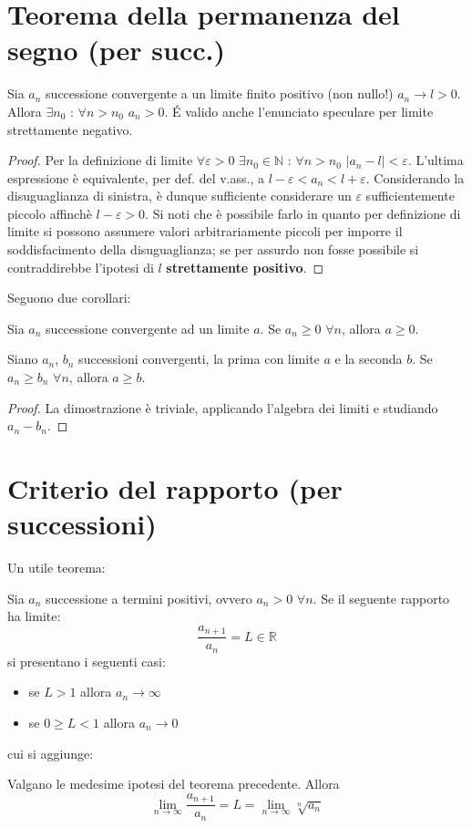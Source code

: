\documentclass[10pt, oneside]{book}
\theoremstyle{plain}
\begin{document}
\section{Teorema della permanenza del segno (per succ.)}
\begin{ther}
    Sia $a_n$ successione convergente a un limite finito positivo (non nullo!) $a_n \rightarrow l > 0$. Allora $\exists n_0$ : $\forall n > n_0$ $a_n > 0$. \'E valido anche l'enunciato speculare per limite strettamente negativo.
\end{ther}
\begin{proof}
    Per la definizione di limite $\forall \varepsilon > 0$ $\exists n_0 \in \mathbb{N}$ : $\forall n > n_0$ $|a_n - l| < \varepsilon$. L'ultima espressione è equivalente, per def. del v.ass., a $l - \varepsilon < a_n < l + \varepsilon$. Considerando la disuguaglianza di sinistra, è dunque sufficiente considerare un $\varepsilon$ sufficientemente piccolo affinchè $l - \varepsilon > 0$. Si noti che è possibile farlo in quanto per definizione di limite si possono assumere valori arbitrariamente piccoli per imporre il soddisfacimento della disuguaglianza; se per assurdo non fosse possibile si contraddirebbe l'ipotesi di $l$ \textbf{strettamente positivo}.
\end{proof}
Seguono due corollari:
\begin{cor}
    Sia $a_n$ successione convergente ad un limite $a$. Se $a_n \geq 0$ $\forall n$, allora $a \geq 0$.
\end{cor}
\begin{cor}
    Siano $a_n$, $b_n$ successioni convergenti, la prima con limite $a$ e la seconda $b$. Se $a_n \geq b_n$ $\forall n$, allora $a \geq b$.
\end{cor}
\begin{proof}
    La dimostrazione è triviale, applicando l'algebra dei limiti e studiando $a_n - b_n$.
\end{proof}

\section{Criterio del rapporto (per successioni)}
Un utile teorema:
\begin{ther}
    Sia $a_n$ successione a termini positivi, ovvero $a_n > 0$ $\forall n$. Se il seguente rapporto ha limite:
    \[\frac{a_{n+1}}{a_n} = L \in \mathbb{R}\]
    si presentano i seguenti casi:
    \begin{itemize}
        \item se $L > 1$ allora $a_n \rightarrow \infty$
        \item se $0 \geq L < 1$ allora $a_n \rightarrow 0$
    \end{itemize}
\end{ther}
cui si aggiunge:
\begin{ther}
    Valgano le medesime ipotesi del teorema precedente. Allora
    \[\lim \limits_{n \rightarrow \infty}\frac{a_{n+1}}{a_n} = L = \lim \limits_{n \rightarrow \infty} \sqrt[n]{a_n}\]
\end{ther}
\end{document}

